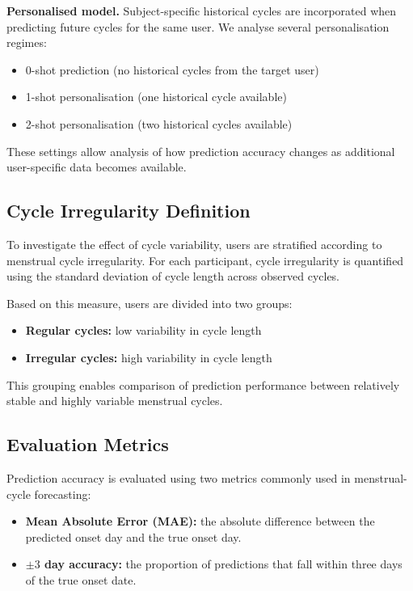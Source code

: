 \documentclass[conference]{IEEEtran}
\begin{document}
\textbf{Personalised model.}  
Subject-specific historical cycles are incorporated when predicting future cycles for the same user. We analyse several personalisation regimes:

\begin{itemize}
\item 0-shot prediction (no historical cycles from the target user)
\item 1-shot personalisation (one historical cycle available)
\item 2-shot personalisation (two historical cycles available)
\end{itemize}

These settings allow analysis of how prediction accuracy changes as additional user-specific data becomes available.

\subsection{Cycle Irregularity Definition}

To investigate the effect of cycle variability, users are stratified according to menstrual cycle irregularity. For each participant, cycle irregularity is quantified using the standard deviation of cycle length across observed cycles.

Based on this measure, users are divided into two groups:

\begin{itemize}
\item \textbf{Regular cycles:} low variability in cycle length
\item \textbf{Irregular cycles:} high variability in cycle length
\end{itemize}

This grouping enables comparison of prediction performance between relatively stable and highly variable menstrual cycles.

\subsection{Evaluation Metrics}

Prediction accuracy is evaluated using two metrics commonly used in menstrual-cycle forecasting:

\begin{itemize}
\item \textbf{Mean Absolute Error (MAE):} the absolute difference between the predicted onset day and the true onset day.
\item \textbf{$\pm3$ day accuracy:} the proportion of predictions that fall within three days of the true onset date.
\end{itemize}
\end{document}
